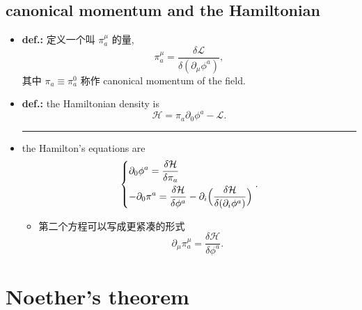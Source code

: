 \subsection{canonical momentum and the Hamiltonian}
\begin{itemize}
	\item \textbf{def.:} 定义一个叫 $\pi_a^\mu$ 的量,
	\begin{equation}
		\pi_a^\mu = \frac{\delta \mathcal{L}}{\delta (\partial_\mu \phi^a)},
	\end{equation}
	其中 $\pi_a \equiv \pi_a^0$ 称作 canonical momentum of the field.
	
	\item \textbf{def.:} the Hamiltonian density is
	\begin{equation}
		\mathcal{H} = \pi_a \partial_0 \phi^a - \mathcal{L}.
	\end{equation}
	
	\noindent\rule[0.5ex]{\linewidth}{0.5pt} %
	
	\item the Hamilton's equations are
	\begin{equation}
		\begin{dcases}
			\partial_0 \phi^a = \frac{\delta \mathcal{H}}{\delta \pi_a} \\
			- \partial_0 \pi^a = \frac{\delta \mathcal{H}}{\delta \phi^a} - \partial_i \Big( \frac{\delta \mathcal{H}}{\delta (\partial_i \phi^a)} \Big)
		\end{dcases}.
	\end{equation}
	\begin{itemize}
		\item 第二个方程可以写成更紧凑的形式
		\begin{equation}
			\partial_\mu \pi_a^\mu = \frac{\delta \mathcal{H}}{\delta \phi^a}.
		\end{equation}
	\end{itemize}
\end{itemize}

\section{Noether's theorem} \label{D.2}
